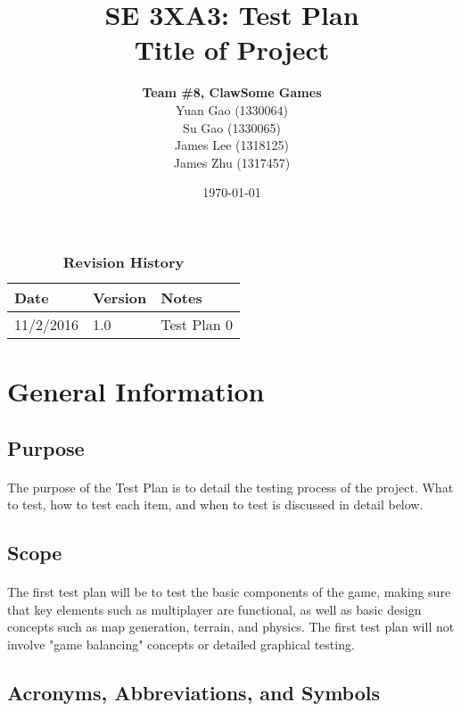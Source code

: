 \documentclass[12pt, titlepage]{article}
\title{SE 3XA3: Test Plan\\Title of Project}
\author{\textbf{Team \#8, ClawSome Games}
		\\ Yuan Gao (1330064)
		\\ Su Gao (1330065)
		\\ James Lee (1318125)
		\\ James Zhu (1317457) 
}
\date{\today}
\begin{document}
\maketitle
{}
\tableofcontents
\listoftables
\listoffigures
\begin{table}[bp]
\caption{\bf Revision History}
\begin{tabularx}{\textwidth}{p{3cm}p{2cm}X}
\toprule {\bf Date} & {\bf Version} & {\bf Notes}\\
\midrule
11/2/2016 & 1.0 & Test Plan 0\\
\bottomrule
\end{tabularx}
\end{table}
\newpage
{}
\section{General Information}
\subsection{Purpose}
\paragraph{}The purpose of the Test Plan is to detail the testing process of the project. What to test, how to test each item, and when to test is discussed in detail below. 
\subsection{Scope}
\paragraph{}The first test plan will be to test the basic components of the game, making sure that key elements such as multiplayer are functional, as well as basic design concepts such as map generation, terrain, and physics. The first test plan will not involve "game balancing" concepts or detailed graphical testing. 
\subsection{Acronyms, Abbreviations, and Symbols}
	
\end{document}

